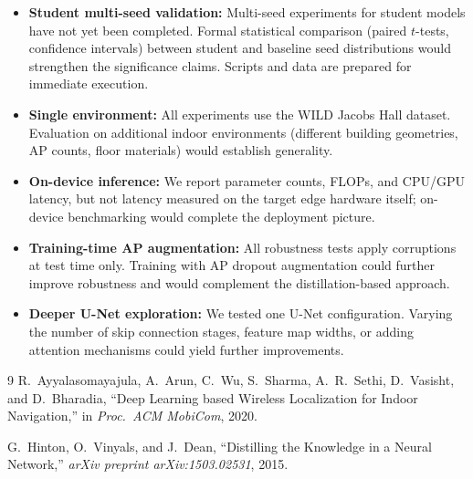 \documentclass[11pt,a4paper]{article}
\begin{document}
\begin{itemize}
  \item \textbf{Student multi-seed validation:} Multi-seed experiments for student models have not yet been completed. Formal statistical comparison (paired $t$-tests, confidence intervals) between student and baseline seed distributions would strengthen the significance claims. Scripts and data are prepared for immediate execution.
  \item \textbf{Single environment:} All experiments use the WILD Jacobs Hall dataset. Evaluation on additional indoor environments (different building geometries, AP counts, floor materials) would establish generality.
  \item \textbf{On-device inference:} We report parameter counts, FLOPs, and CPU/GPU latency, but not latency measured on the target edge hardware itself; on-device benchmarking would complete the deployment picture.
  \item \textbf{Training-time AP augmentation:} All robustness tests apply corruptions at test time only. Training with AP dropout augmentation could further improve robustness and would complement the distillation-based approach.
  \item \textbf{Deeper U-Net exploration:} We tested one U-Net configuration. Varying the number of skip connection stages, feature map widths, or adding attention mechanisms could yield further improvements.
\end{itemize}




\begin{thebibliography}{9}
R.~Ayyalasomayajula, A.~Arun, C.~Wu, S.~Sharma, A.~R.~Sethi, D.~Vasisht, and D.~Bharadia,
``Deep Learning based Wireless Localization for Indoor Navigation,''
in \textit{Proc.\ ACM MobiCom}, 2020.

G.~Hinton, O.~Vinyals, and J.~Dean,
``Distilling the Knowledge in a Neural Network,''
\textit{arXiv preprint arXiv:1503.02531}, 2015.
\end{thebibliography}
\end{document}
